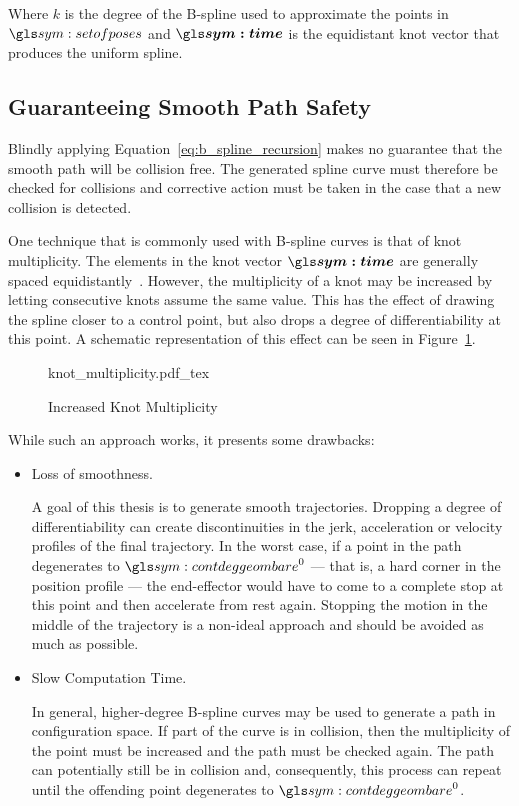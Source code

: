 	Where $k$ is the degree of the B-spline used to approximate the points in
	$\setofposes$ and $\vec{\timesym}$ is the equidistant knot vector that
	produces the uniform spline.

	\subsection{Guaranteeing Smooth Path Safety}%
	\label{sec:guaranteeing_smooth_path_safety}

		Blindly applying Equation~\ref{eq:b_spline_recursion} makes no guarantee
		that the smooth path will be collision free. The generated spline curve
		must therefore be checked for collisions and corrective action must be
		taken in the case that a new collision is detected.

		One technique that is commonly used with B-spline curves is that of knot
		multiplicity. The elements in the knot vector $\vec{\timesym}$ are
		generally spaced equidistantly~\cite{bib:math:spline_notes}. However,
		the multiplicity of a knot may be increased by letting consecutive knots
		assume the same value. This has the effect of drawing the spline closer
		to a control point, but also drops a degree of differentiability at this
		point. A schematic representation of this effect can be seen in
		Figure~\ref{fig:knot_multiplicity}.

		\begin{figure}[hb]
			\centering
			\def\svgwidth{\columnwidth}
			{knot_multiplicity.pdf_tex}
			\caption{Increased Knot Multiplicity}%
			\label{fig:knot_multiplicity}
		\end{figure}

		While such an approach works, it presents some drawbacks:

		\begin{itemize}

			\item Loss of smoothness.

				A goal of this thesis is to generate smooth trajectories.
				Dropping a degree of differentiability can create
				discontinuities in the jerk, acceleration or velocity profiles
				of the final trajectory. In the worst case, if a point in the
				path degenerates to $\contdeggeom{0}$ --- that is, a hard corner
				in the position profile --- the end-effector would have to come
				to a complete stop at this point and then accelerate from rest
				again. Stopping the motion in the middle of the trajectory is a
				non-ideal approach and should be avoided as much as possible.

			\item Slow Computation Time.

				In general, higher-degree B-spline curves may be used to
				generate a path in configuration space. If part of the curve is
				in collision, then the multiplicity of the point must be
				increased and the path must be checked again. The path can
				potentially still be in collision and, consequently, this
				process can repeat until the offending point degenerates to
				$\contdeggeom{0}$.

		\end{itemize}

